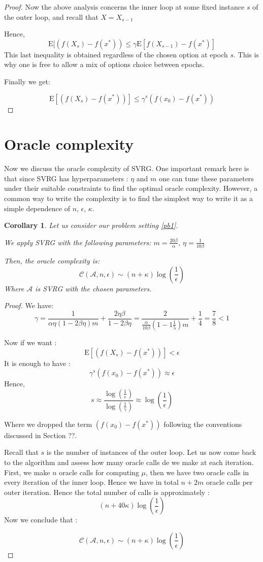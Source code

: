 \documentclass[12pt]{report}
\newtheorem{corollary}[lemma]{Corollary}
\newcounter{theo}[section]
\newcommand{\E}{\mathrm{E}}
\begin{document}
\begin{proof}
Now the above analysis concerns the inner loop at some fixed instance $s$ of the outer loop, and recall that $X=X_{s-1}$

Hence,
$$\E[\left(f({X}_s)-f(x^*)\right) \leq \gamma\E[f({X}_{s-1})-f(x^*)]$$
This last inequality is obtained regardless of the chosen option at epoch $s$. This is why one is free to allow a mix of options choice between epochs.

Finally we get:

$$\E[\left(f({X}_s)-f(x^*)\right)]
\leq \gamma^s \left(f({x}_{0})-f(x^*)\right)$$
\end{proof}


\section{Oracle complexity}
Now we discuss the oracle complexity of SVRG. One important remark here is that since SVRG has hyperparameters : $\eta$ and $m$ one can tune these parameters under their suitable constraints to find the optimal oracle complexity. However, a common way to write the complexity is to find the simplest way to write it as a simple dependence of $n$, $\epsilon$, $\kappa$.
\begin{corollary}


Let us consider our problem setting \ref{pb1}.

We apply SVRG with the following parameters:
$m=\frac{20\beta}{\alpha}$,  $\eta=\frac{1}{10\beta}$

Then, the oracle complexity is:
$$ \mathcal{C}(\mathcal{A},n,\epsilon)\sim \left(n+\kappa \right)\log\left(\frac{1}{\epsilon}\right)$$
Where $\mathcal{A}$ is SVRG with the chosen parameters.
\end{corollary}

\begin{proof}
We have:
$$\gamma=\frac{1}{\alpha\eta(1-2\beta\eta)m}+\frac{2\eta\beta}{1-2\beta\eta}=\frac{2}{\frac{\alpha}{10\beta}(1-1\frac{1}{5})m}+\frac{1}{4}=\frac{7}{8}<1$$


Now if we want : $$\E[\left(f({X}_s)-f(x^*)\right)]<\epsilon $$
It is enough to have : 
$$\gamma^s \left(f({x}_{0})-f(x^*)\right)\approx \epsilon$$
Hence, $$s \approx \frac{\log(\frac{1}{\epsilon})}{\log(\frac{1}{\gamma})} \approx {\log\left(\frac{1}{\epsilon}\right)}$$

Where we dropped the term $\left(f({x}_{0})-f(x^*)\right)$  following the conventions discussed in Section ??.

Recall that $s$ is the number of instances of the outer loop. Let us now come back to the algorithm and assess how many oracle calls de we make at each iteration. First, we make $n$ oracle calls for computing $\mu$, then we have two oracle calls in every iteration of the inner loop. Hence we have in total $n+2m$ oracle calls per outer iteration.
Hence the total number of calls is approximately :
$$(n+40\kappa) {\log\left(\frac{1}{\epsilon}\right)}$$
Now we conclude that :

$$ \mathcal{C}(\mathcal{A},n,\epsilon)\sim \left(n+\kappa \right)\log\left(\frac{1}{\epsilon}\right)$$


\end{proof}
\end{document}
